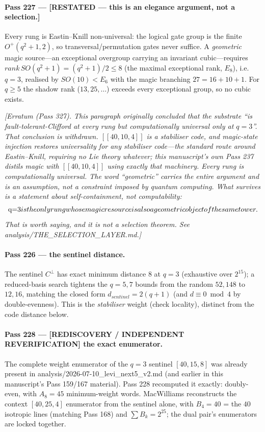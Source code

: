 \documentclass[12pt,a4paper]{article}
\def\mathrm#1{#1}%
\def\mathbf#1{#1}%
\def\textbf#1{#1}%
\def\textit#1{#1}%
\def\texttt#1{#1}%
\def\text#1{#1}%
\theoremstyle{definition}
\begin{document}
\paragraph{Pass 227 --- \textnormal{[RESTATED --- this is an elegance argument,
not a selection.]}} Every rung is Eastin--Knill
non-universal: the logical gate group is the finite $\mathrm{O}^+(q^2+1,2)$, so
transversal/permutation gates never suffice. A \emph{geometric} magic source---an
exceptional overgroup carrying an invariant cubic---requires
$\mathrm{rank}\,\mathrm{SO}(q^2+1)=(q^2+1)/2\le 8$ (the maximal exceptional rank,
$E_8$), i.e.\ $q=3$, realised by $\mathrm{SO}(10)<E_6$ with the magic branching
$\mathbf{27}=\mathbf{16}+\mathbf{10}+\mathbf 1$. For $q\ge 5$ the shadow rank
($13,25,\dots$) exceeds every exceptional group, so no cubic exists.

\emph{[Erratum (Pass 327). This paragraph originally concluded that the substrate
``is fault-tolerant-Clifford at every rung but computationally \emph{universal}
only at $q=3$''. That conclusion is \textbf{withdrawn}. $[[40,10,4]]$ is a
stabiliser code, and magic-state injection restores universality for \emph{any}
stabiliser code---the standard route around Eastin--Knill, requiring no Lie theory
whatever; this manuscript's own Pass 237 distils magic with $[[40,10,4]]$ using
exactly that machinery. \textbf{Every rung is computationally universal.} The word
``geometric'' carries the entire argument and is an \emph{assumption}, not a
constraint imposed by quantum computing. What survives is a statement about
self-containment, not computability:
\[
\textit{$q=3$ is the only rung whose magic resource is \textbf{also} a geometric
object of the same tower.}
\]
That is worth saying, and it is not a selection theorem. See
\texttt{analysis/THE\_SELECTION\_LAYER.md}.]}

\paragraph{Pass 226 --- the sentinel distance.} The sentinel $C^{\perp}$ has exact
minimum distance $8$ at $q=3$ (exhaustive over $2^{15}$); a reduced-basis search
tightens the $q=5,7$ bounds from the random $52,148$ to $12,16$, matching the
closed form $d_{\text{sentinel}}=2(q+1)$ (and $d\equiv 0\bmod 4$ by
double-evenness). This is the \emph{stabiliser} weight (check locality), distinct
from the code distance below.

\paragraph{Pass 228 --- \textnormal{[REDISCOVERY / INDEPENDENT REVERIFICATION]}
the exact enumerator.} The complete weight enumerator of
the $q=3$ sentinel $[40,15,8]$ was already present in
\texttt{analysis/2026-07-10\_levi\_next5\_v2.md} (and earlier in this manuscript's
Pass 159/167 material). Pass 228 recomputed it exactly: doubly-even, with $A_8=45$
minimum-weight words. MacWilliams reconstructs the context $[40,25,4]$ enumerator
from the sentinel alone, with $B_4=40$ = the $40$ isotropic lines (matching
Pass 168) and $\sum B_k=2^{25}$; the dual pair's enumerators are locked together.
\end{document}
